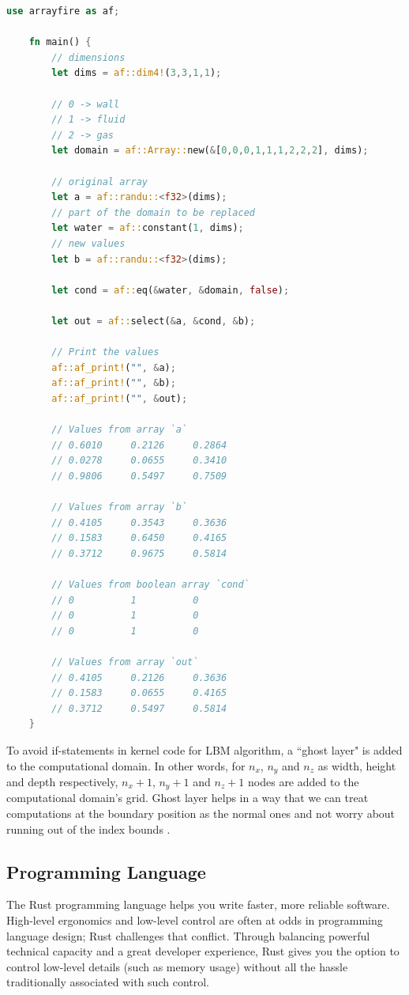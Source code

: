 \begin{lstlisting}[language=Rust, caption=Example Rust code of removing branch divergence using ArrayFire]
	use arrayfire as af;
	
	fn main() {
		// dimensions
		let dims = af::dim4!(3,3,1,1);
		
		// 0 -> wall
		// 1 -> fluid
		// 2 -> gas
		let domain = af::Array::new(&[0,0,0,1,1,1,2,2,2], dims);
		
		// original array
		let a = af::randu::<f32>(dims);
		// part of the domain to be replaced
		let water = af::constant(1, dims);
		// new values
		let b = af::randu::<f32>(dims);
		
		let cond = af::eq(&water, &domain, false);
		
		let out = af::select(&a, &cond, &b);
		
		// Print the values
		af::af_print!("", &a);
		af::af_print!("", &b);
		af::af_print!("", &out);
		
		// Values from array `a`
		// 0.6010     0.2126     0.2864 
		// 0.0278     0.0655     0.3410 
		// 0.9806     0.5497     0.7509 
		
		// Values from array `b`
		// 0.4105     0.3543     0.3636 
		// 0.1583     0.6450     0.4165 
		// 0.3712     0.9675     0.5814 
		
		// Values from boolean array `cond`
		// 0          1          0 
		// 0          1          0 
		// 0          1          0 
		
		// Values from array `out`
		// 0.4105     0.2126     0.3636 
		// 0.1583     0.0655     0.4165 
		// 0.3712     0.5497     0.5814 
	}
\end{lstlisting}

To avoid if-statements in kernel code for LBM algorithm, a ``ghost layer" is added to the computational domain. In other words, for $n_x$, $n_y$ and $n_z$ as width, height and depth respectively, $n_x+1$, $n_y+1$ and $n_z+1$ nodes are added to the computational domain's grid. Ghost layer helps in a way that we can treat computations at the boundary position as the normal ones and not worry about running out of the index bounds \cite{tranPerformanceOptimization3D2017}.
	
\subsection{Programming Language}

The Rust programming language helps you write faster, more reliable software. High-level ergonomics and low-level control are often at odds in programming language design; Rust challenges that conflict. Through balancing powerful technical capacity and a great developer experience, Rust gives you the option to control low-level details (such as memory usage) without all the hassle traditionally associated with such control. \cite{steveklabnik2018}

